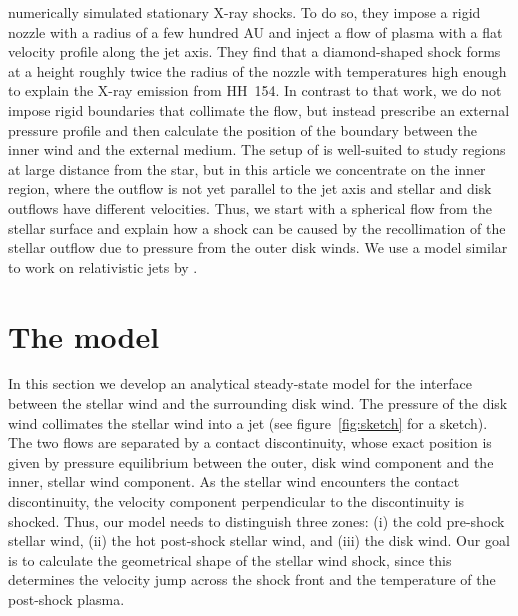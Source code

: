 \documentclass{emulateapj}
\begin{document}
\citet{2011ApJ...737...54B} numerically simulated stationary X-ray shocks. To do so, they impose a rigid nozzle with a radius of a few hundred AU and inject a flow of plasma with a flat velocity profile along the jet axis. They find that a diamond-shaped shock forms at a height roughly twice the radius of the nozzle with temperatures high enough to explain the X-ray emission from HH~154. In contrast to that work, we do not impose rigid boundaries that collimate the flow, but instead prescribe an external pressure profile and then calculate the position of the boundary between the inner wind and the external medium. The setup of \citet{2011ApJ...737...54B} is well-suited to study regions at large distance from the star, but in this article we concentrate on the inner region, where the outflow is not yet parallel to the jet axis and stellar and disk outflows have different velocities. Thus, we start with a spherical flow from the stellar surface and explain how a shock can be caused by the recollimation of the stellar outflow due to pressure from the outer disk winds. We use a model similar to work on relativistic jets by \citet{2012MNRAS.422.2282K}.

\section{The model}

In this section we develop an analytical steady-state model for the interface between the stellar wind and the surrounding disk wind. The pressure of the disk wind collimates the stellar wind into a jet (see figure~\ref{fig:sketch} for a sketch). The two flows are separated by a contact discontinuity, whose exact position is given by pressure equilibrium between the outer, disk wind component and the inner, stellar wind component. As the stellar wind encounters the contact discontinuity, the velocity component perpendicular to the discontinuity is shocked. Thus, our model needs to distinguish three zones: (i) the cold pre-shock stellar wind, (ii) the hot post-shock stellar wind, and (iii) the disk wind. Our goal is to calculate the geometrical shape of the stellar wind shock, since this determines the velocity jump across the shock front and the temperature of the post-shock plasma. 
\end{document}

